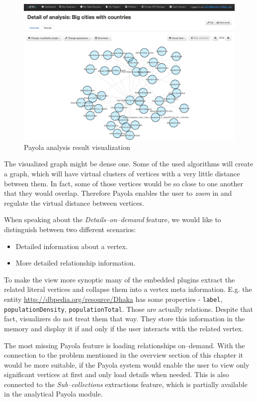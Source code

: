 \begin{figure}
	\centering
	\includegraphics[width=140mm]{img/payola.png}
	\caption{Payola analysis result visualization}
	\label{fig:palyola-vis}
\end{figure}


The visualized graph might be dense one. Some of the used algorithms will create a graph, which
will have virtual clusters of vertices with a very little distance between them. In fact, some of those
vertices would be so close to one another that they would overlap. Therefore Payola enables the
user to \emph{zoom} in and regulate the virtual distance between vertices.

When speaking about the \emph{Details--on--demand} feature, we would like to distinguish
between two different
scenarios:

\begin{itemize}
\item Detailed information about a vertex.
\item More detailed relationship information.
\end{itemize}

To make the view more synoptic many of the embedded plugins extract the related literal
vertices and collapse them into a vertex meta information. E.g. the entity
\url{http://dbpedia.org/resource/Dhaka} has some properties - \texttt{label},
\texttt{populationDensity}, \texttt{populationTotal}.
Those are actually relations. Despite that fact, visualizers do not treat them
that way. They store this information in the memory and display it if and only if the user
interacts with the related vertex.

The most missing Payola feature is loading relationships on--demand. With the connection to the
problem
mentioned in the overview section of this chapter it would be more suitable, if the Payola system
would enable the user to view only significant vertices at first and only load details when needed.
This is also connected to the \emph{Sub--collections} extractions feature, which is partially available
in the analytical Payola module.

